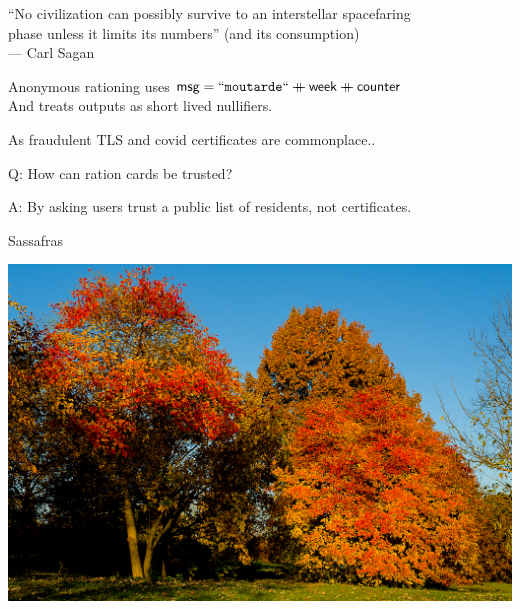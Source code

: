 \documentclass{beamer}
\begin{document}
\begin{frame}

``No civilization can possibly survive to an interstellar spacefaring \\ \smallskip
\hspace{1pt} phase unless it limits its numbers'' (and its consumption) \\ \medskip
\hspace{1pt} --- Carl Sagan

\pause\bigskip\bigskip 

Anonymous rationing uses $\mathsf{msg} = \mathtt{``moutarde``} \mathbin{+\mkern-10mu+} \mathsf{week} \mathbin{+\mkern-10mu+} \mathsf{counter}$ \\
\hspace{1pt} And treats outputs as short lived nullifiers.

\end{frame}



\begin{frame}

As fraudulent TLS and covid certificates are commonplace..

\bigskip

Q: How can ration cards be trusted?

\bigskip 

A: By asking users trust a public list of residents, not certificates.


\end{frame}



\begin{frame}{Sassafras}

\includegraphics[width=\textwidth]{Sassafras-albidum.jpg}

\end{frame}
\end{document}

